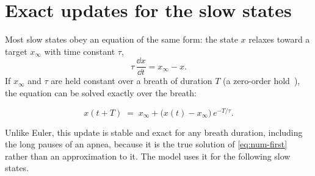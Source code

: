 \section{Exact updates for the slow states}
\label{sec:num-exact}
Most slow states obey an equation of the same form: the state $x$ relaxes toward a target $x_\infty$ with time constant $\tau$,
\begin{equation}
\tau\,\frac{\dd x}{\dd t} = x_\infty - x .
\label{eq:num-first}
\end{equation}
If $x_\infty$ and $\tau$ are held constant over a breath of duration $T$ (a zero-order hold~\citep{franklin1998}), the equation can be solved exactly over the breath:
\begin{keyequation}
\begin{equation}
x(t+T) \;=\; x_\infty + \bigl(x(t) - x_\infty\bigr)\,e^{-T/\tau}.
\label{eq:num-exact}
\end{equation}
\end{keyequation}
Unlike Euler, this update is stable and exact for any breath duration, including the long pauses of an apnea, because it is the true solution of \cref{eq:num-first} rather than an approximation to it. The model uses it for the following slow states.


